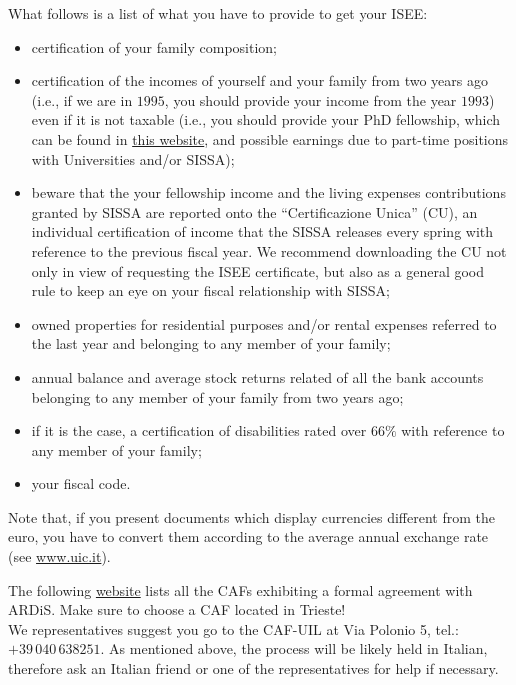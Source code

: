 \documentclass{sissavademecum}
\begin{document}
\begin{itemize}
    What follows is a list of what you have to provide to get your ISEE:
    \begin{itemize}
        \item certification of your family composition;
        \item certification of the incomes of yourself and your family from two years ago (i.e., if we are in $1995$, you should provide your income from the year $1993$) even if it is not taxable (i.e., you should provide your PhD fellowship, which can be found in \href{https://www.sissa.u-gov.it/u-gov-ru/bp/desktop.RU99CEDOLID_1914958969.RU99CEDOL/siaru/cedolini/cedolini_main.iface}{this website}, and possible earnings due to part-time positions with Universities and/or SISSA);
        \item beware that the your fellowship income and the living expenses contributions granted by SISSA are reported onto the ``Certificazione Unica'' (CU), an individual certification of income that the SISSA releases every spring with reference to the previous fiscal year. We recommend downloading the CU not only in view of requesting the ISEE certificate, but also as a general good rule to keep an eye on your fiscal relationship with SISSA;
        \item owned properties for residential purposes and/or rental expenses referred to the last year and belonging to any member of your family;
        \item annual balance and average stock returns related of all the bank accounts belonging to any member of your family from two years ago;
        \item if it is the case, a certification of disabilities rated over $66\%$ with reference to any member of your family;
        \item your fiscal code.
    \end{itemize}
    Note that, if you present documents which display currencies different from the euro, you have to convert them according to the average annual exchange rate (see \url{www.uic.it}).
    
    The following \href{http://www.ardiss.fvg.it/contenuti.php?view=news&id=9518&tipo=evidenza}{website} lists all the CAFs exhibiting a formal agreement with ARDiS. Make sure to choose a CAF located in Trieste! \\
    We representatives suggest you go to the CAF-UIL at Via Polonio 5, tel.: $+39 \, 040 \, 638251$. As mentioned above, the process will be likely held in Italian, therefore ask an Italian friend or one of the representatives for help if necessary.
\end{itemize}
\end{document}

